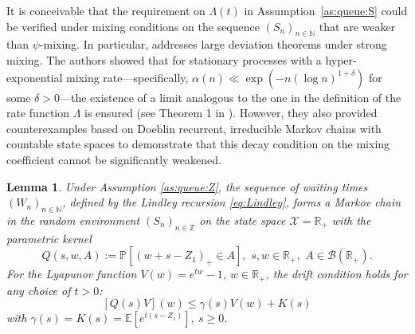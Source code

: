 \documentclass[a4paper,10pt]{article}
\newtheorem{lemma}[theorem]{Lemma}
\newcommand{\N}{\mathbb{N}}
\newcommand{\Z}{\mathbb{Z}}
\newcommand{\R}{\mathbb{R}}
\newcommand{\B}{\mathcal{B}}
\newcommand{\X}{\mathcal{X}}
\renewcommand{\P}{\mathbb{P}}
\newcommand{\E}{\mathbb{E}}
\begin{document}
It is conceivable that the requirement on $\Lambda(t)$ in Assumption~\ref{as:queue:S} could be verified under mixing conditions on the sequence $(S_n)_{n\in\N}$ that are weaker than $\psi$-mixing. In particular, \cite{Bryc1996LDP} addresses large deviation theorems under strong mixing. The authors showed that for stationary processes with a hyper-exponential mixing rate—specifically, $\alpha(n) \ll \exp(-n (\log n)^{1+\delta})$ for some $\delta > 0$—the existence of a limit analogous to the one in the definition of the rate function $\Lambda$ is ensured (see Theorem 1 in \cite{Bryc1996LDP}). However, they also provided counterexamples based on Doeblin recurrent, irreducible Markov chains with countable state spaces to demonstrate that this decay condition on the mixing coefficient cannot be significantly weakened.


\begin{lemma}\label{lem:queue:driftLT}
	Under Assumption \ref{as:queue:Z}, the sequence of waiting times $(W_n)_{n\in\N}$, defined by the Lindley recursion \eqref{eq:Lindley}, forms a Markov chain in the random environment $(S_n)_{n\in\Z}$ on the state space $\X = \R_{+}$ with the parametric kernel
	\begin{equation*}
		Q(s, w, A) := \P \left[\left(w + s - Z_1\right)_+ \in A\right], \,\,
		s , w \in \R_{+},\,\, A \in \B\left(\R_{+}\right).
	\end{equation*}
	For the Lyapunov function $V(w) = e^{t w}-1$, $w\in\R_{+}$, the drift condition holds for any choice of $t>0$:
	$$
	[Q(s)V](w)\le \gamma (s) V(w)+K(s)
	$$
	with $\gamma (s) = K(s) = \E\left[e^{t(s-Z_1)}\right]$, $s \ge 0$.
\end{lemma}
\end{document}
